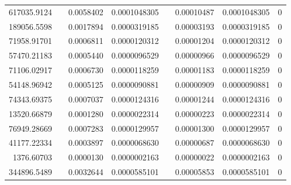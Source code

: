 \documentclass[
journal=jacsat, %
manuscript=article]{achemso}
\begin{document}
\begin{table}[htbp]
{\begin{tabular}{rrrrrrrr}
    617035.9124 &       & 0.0058402 & 0.0001048305 &       & 0.00010487 & 0.0001048305 & 0 \\
    189056.5598 &       & 0.0017894 & 0.0000319185 &       & 0.00003193 & 0.0000319185 & 0 \\
    71958.91701 &       & 0.0006811 & 0.0000120312 &       & 0.00001204 & 0.0000120312 & 0 \\
    57470.21183 &       & 0.0005440 & 0.0000096529 &       & 0.00000966 & 0.0000096529 & 0 \\
    71106.02917 &       & 0.0006730 & 0.0000118259 &       & 0.00001183 & 0.0000118259 & 0 \\
    54148.96942 &       & 0.0005125 & 0.0000090881 &       & 0.00000909 & 0.0000090881 & 0 \\
    74343.69375 &       & 0.0007037 & 0.0000124316 &       & 0.00001244 & 0.0000124316 & 0 \\
    13520.66879 &       & 0.0001280 & 0.0000022314 &       & 0.00000223 & 0.0000022314 & 0 \\
    76949.28669 &       & 0.0007283 & 0.0000129957 &       & 0.00001300 & 0.0000129957 & 0 \\
    41177.22334 &       & 0.0003897 & 0.0000068630 &       & 0.00000687 & 0.0000068630 & 0 \\
    1376.60703 &       & 0.0000130 & 0.0000002163 &       & 0.00000022 & 0.0000002163 & 0 \\
    344896.5489 &       & 0.0032644 & 0.0000585101 &       & 0.00005853 & 0.0000585101 & 0 \\
    \bottomrule
    \end{tabular}%
    }
  \label{tab:addlabel}%
\end{table}%
\end{document}
